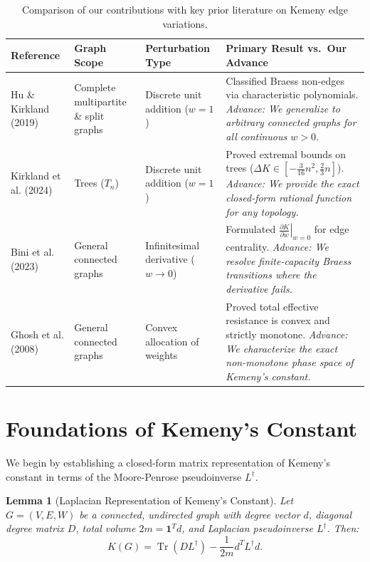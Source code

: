 \documentclass[11pt,a4paper]{article}
\theoremstyle{plain}
\newtheorem{lemma}[theorem]{Lemma}
\theoremstyle{definition}
\begin{document}
\begin{table}[htbp]
\centering
\small
\caption{Comparison of our contributions with key prior literature on Kemeny edge variations.}
\label{tab:literature}
\begin{tabular}{@{}p{3.2cm}p{3.8cm}p{3.5cm}p{4.2cm}@{}}
\toprule
\textbf{Reference} & \textbf{Graph Scope} & \textbf{Perturbation Type} & \textbf{Primary Result vs.\ Our Advance} \\
\midrule
Hu \& Kirkland (2019)~\cite{hu2019complete} & Complete multipartite \& split graphs & Discrete unit addition ($w=1$) & Classified Braess non-edges via characteristic polynomials. \textit{Advance: We generalize to arbitrary connected graphs for all continuous $w > 0$.} \\
\addlinespace
Kirkland et al. (2024)~\cite{kirkland2023edge} & Trees ($T_n$) & Discrete unit addition ($w=1$) & Proved extremal bounds on trees ($\Delta K \in [-\frac{3}{16}n^2, \frac{2}{3}n]$). \textit{Advance: We provide the exact closed-form rational function for any topology.} \\
\addlinespace
Bini et al. (2023)~\cite{bini2023edge} & General connected graphs & Infinitesimal derivative ($w \to 0$) & Formulated $\left.\frac{\partial K}{\partial w}\right|_{w=0}$ for edge centrality. \textit{Advance: We resolve finite-capacity Braess transitions where the derivative fails.} \\
\addlinespace
Ghosh et al. (2008)~\cite{ghosh2008minimizing} & General connected graphs & Convex allocation of weights & Proved total effective resistance is convex and strictly monotone. \textit{Advance: We characterize the exact non-monotone phase space of Kemeny's constant.} \\
\bottomrule
\end{tabular}
\end{table}

\section{Foundations of Kemeny's Constant}
\label{sec:foundations}

We begin by establishing a closed-form matrix representation of Kemeny's constant in terms of the Moore-Penrose pseudoinverse $L^\dagger$.

\begin{lemma}[Laplacian Representation of Kemeny's Constant]
\label{lem:kemeny_laplacian}
Let $G = (V, E, W)$ be a connected, undirected graph with degree vector $d$, diagonal degree matrix $D$, total volume $2m = \mathbf{1}^T d$, and Laplacian pseudoinverse $L^\dagger$. Then:
\begin{equation}
    K(G) = \operatorname{Tr}(D L^\dagger) - \frac{1}{2m} d^T L^\dagger d.
\end{equation}
\end{lemma}
\end{document}
